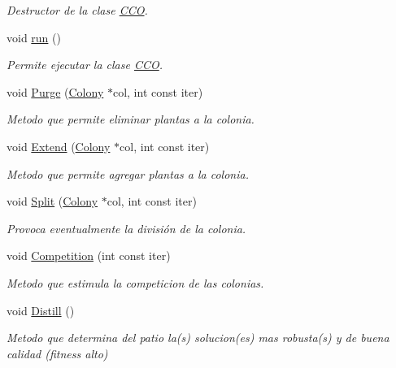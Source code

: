 \begin{DoxyCompactItemize}
\begin{DoxyCompactList}\small\item\em Destructor de la clase \hyperlink{class_c_c_o}{C\+C\+O}. \end{DoxyCompactList}\item 
void \hyperlink{class_c_c_o_abe96cee0e1a470ea4210ecafe0a4c13e}{run} ()
\begin{DoxyCompactList}\small\item\em Permite ejecutar la clase \hyperlink{class_c_c_o}{C\+C\+O}. \end{DoxyCompactList}\item 
void \hyperlink{class_c_c_o_a611537d0f46ae4573b08a0d8c343da5c}{Purge} (\hyperlink{class_colony}{Colony} $\ast$col, int const iter)
\begin{DoxyCompactList}\small\item\em Metodo que permite eliminar plantas a la colonia. \end{DoxyCompactList}\item 
void \hyperlink{class_c_c_o_a81583df8113bfdd76f5d5d541bdab892}{Extend} (\hyperlink{class_colony}{Colony} $\ast$col, int const iter)
\begin{DoxyCompactList}\small\item\em Metodo que permite agregar plantas a la colonia. \end{DoxyCompactList}\item 
void \hyperlink{class_c_c_o_a5804afdd4b0361d7507fab4b3ab71703}{Split} (\hyperlink{class_colony}{Colony} $\ast$col, int const iter)
\begin{DoxyCompactList}\small\item\em Provoca eventualmente la división de la colonia. \end{DoxyCompactList}\item 
void \hyperlink{class_c_c_o_a8b93a09d017497a2a636bd092883f06a}{Competition} (int const iter)
\begin{DoxyCompactList}\small\item\em Metodo que estimula la competicion de las colonias. \end{DoxyCompactList}\item 
void \hyperlink{class_c_c_o_ae92e0bf5ad45ce36f7e078634e1f42f1}{Distill} ()
\begin{DoxyCompactList}\small\item\em Metodo que determina del patio la(s) solucion(es) mas robusta(s) y de buena calidad (fitness alto) \end{DoxyCompactList}\end{DoxyCompactItemize}


